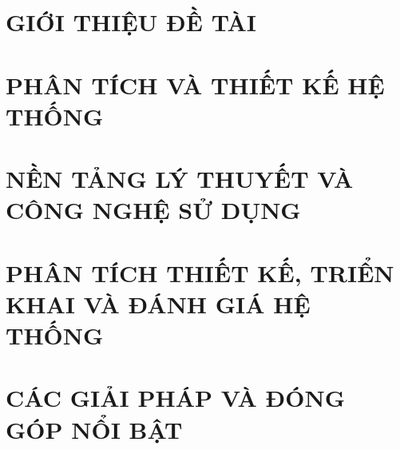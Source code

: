 \documentclass[a4paper,13pt,3p,twoside]{report}
\theoremstyle{definition}
\begin{document}


% 

\newpage


\newpage



\newpage
{}

\pagestyle{fancy}
\fancyhf{}
\fancyhead[RE, LO]{\leftmark}
\fancyfoot[RE, LO]{\thepage}

\chapter{GIỚI THIỆU ĐỀ TÀI}
\label{chapter:Introduction}

\newpage
\chapter{PHÂN TÍCH VÀ THIẾT KẾ HỆ THỐNG}
\label{chapter:Related_works}



\newpage
\chapter{NỀN TẢNG LÝ THUYẾT VÀ CÔNG NGHỆ SỬ DỤNG}
\label{chapter:Methodology}


\newpage
\chapter{PHÂN TÍCH THIẾT KẾ, TRIỂN KHAI VÀ ĐÁNH GIÁ HỆ THỐNG}
\label{chapter:Experiment}


\newpage
\chapter{CÁC GIẢI PHÁP VÀ ĐÓNG GÓP NỔI BẬT}
\label{chapter:SolutionAndContribution}

\end{document}
